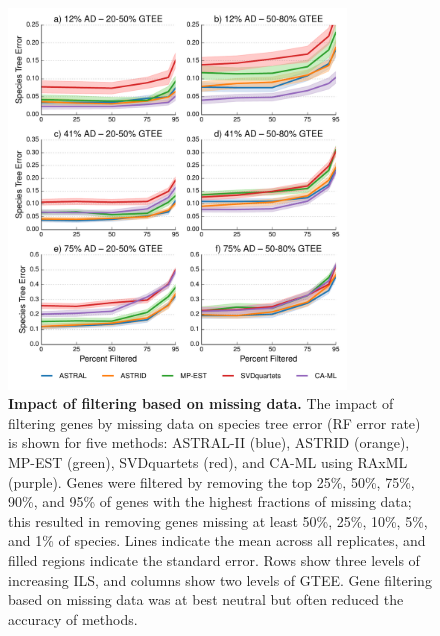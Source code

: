 \begin{figure}[!h]
\centering
\includegraphics[width=0.80\textwidth]{figures/gene-filtering-fig4.pdf}
\caption{{\bf Impact of filtering based on missing data.} The impact of filtering genes by missing data on species tree error (RF error rate) is shown for five methods: ASTRAL-II (blue), ASTRID (orange), MP-EST (green), SVDquartets (red), and CA-ML using RAxML (purple). 
Genes were filtered by removing the top 25\%, 50\%, 75\%, 90\%, and 95\% of genes with the highest fractions of missing data; this resulted in removing genes missing at least 50\%, 25\%, 10\%, 5\%, and 1\% of species. 
Lines indicate the mean across all replicates, and filled regions indicate the standard error. 
Rows show three levels of increasing ILS, and columns show two levels of GTEE. 
Gene filtering based on missing data was at best neutral but often reduced the accuracy of methods.}
\label{fig:include-4}
\end{figure}

